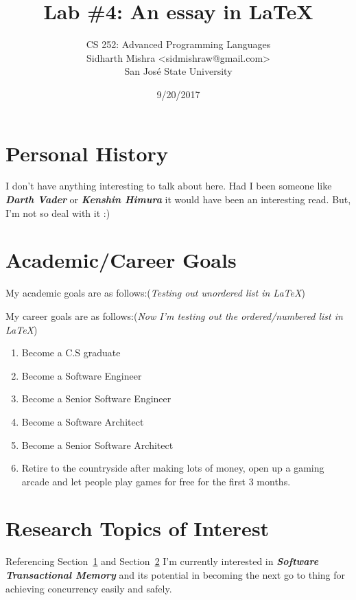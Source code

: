 \documentclass{article}
\title{Lab \#4: An essay in LaTeX}
\author{
  CS 252: Advanced Programming Languages \\
  Sidharth Mishra \textless{sidmishraw@gmail.com}\textgreater \\
  San Jos\'{e} State University \\
}
\date{9/20/2017}
\begin{document}
\maketitle

\section{Personal History}
\label{sec:one}
I don't have anything interesting to talk about here.
Had I been someone like \textbf{\emph{Darth Vader}} or \textbf{\emph{Kenshin Himura}} it would have been an interesting read. But, I'm not so deal with it :) \\


\section{Academic/Career Goals}
\label{sec:two}
My academic goals are as follows:(\emph{Testing out unordered list in LaTeX})

\noindent
\newline
My career goals are as follows:(\emph{Now I'm testing out the ordered/numbered list in LaTeX})
\begin{enumerate}
  \item Become a C.S graduate
  \item Become a Software Engineer
  \item Become a Senior Software Engineer
  \item Become a Software Architect
  \item Become a Senior Software Architect
  \item Retire to the countryside after making lots of money, open up a gaming arcade and let people play games for free for the first 3 months.
\end{enumerate}
\noindent
\section{Research Topics of Interest}
Referencing Section~\ref{sec:one} and Section~\ref{sec:two}
\noindent
\newline{}
\newline{}
I'm currently interested in \textbf{\emph{Software Transactional Memory}}\cite{Castor:2011:STM:2095050.2095071}\cite{Gottschlich:2010:EST:1772954.1772970} and its potential in becoming the next go to thing for achieving concurrency easily and safely.
{}

\end{document}
